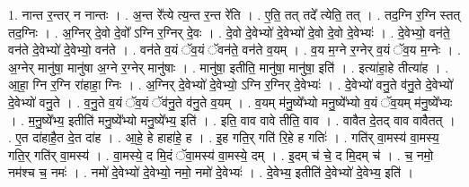 \documentclass[17pt]{extarticle}
\begin{document}
1. नान्त र॒न्तर् न नान्तः । . अ॒न्त रे᳚त्ये त्य॒न्त र॒न्त रे॑ति । . ए॒ति॒ तत् तदे᳚ त्येति॒ तत् । . तद॒ग्नि र॒ग्नि स्तत् तद॒ग्निः । . अ॒ग्निर् दे॒वो दे॒वो᳚ ऽग्नि र॒ग्निर् दे॒वः । . दे॒वो दे॒वेभ्यो॑ दे॒वेभ्यो॑ दे॒वो दे॒वो दे॒वेभ्यः॑ । . दे॒वेभ्यो॒ वन॑ते॒ वन॑ते दे॒वेभ्यो॑ दे॒वेभ्यो॒ वन॑ते । . वन॑ते व॒यं ॅव॒यं ॅवन॑ते॒ वन॑ते व॒यम् । . व॒य म॒ग्ने र॒ग्नेर् व॒यं ॅव॒य म॒ग्नेः । . अ॒ग्नेर् मानु॑षा॒ मानु॑षा अ॒ग्ने र॒ग्नेर् मानु॑षाः । . मानु॑षा॒ इतीति॒ मानु॑षा॒ मानु॑षा॒ इति॑ । . इत्या॑हा॒हे तीत्या॑ह । . आ॒हा॒ ग्नि र॒ग्नि रा॑हाहा॒ ग्निः । . अ॒ग्निर् दे॒वेभ्यो॑ दे॒वेभ्यो॒ ऽग्नि र॒ग्निर् दे॒वेभ्यः॑ । . दे॒वेभ्यो॑ वनु॒ते व॑नु॒ते दे॒वेभ्यो॑ दे॒वेभ्यो॑ वनु॒ते । . व॒नु॒ते व॒यं ॅव॒यं ॅव॑नु॒ते व॑नु॒ते व॒यम् । . व॒यम् म॑नु॒ष्ये᳚भ्यो मनु॒ष्ये᳚भ्यो व॒यं ॅव॒यम् म॑नु॒ष्ये᳚भ्यः । . म॒नु॒ष्ये᳚भ्य॒ इतीति॑ मनु॒ष्ये᳚भ्यो मनु॒ष्ये᳚भ्य॒ इति॑ । . इति॒ वाव वावे तीति॒ वाव । . वावैत दे॒तद् वाव वावैतत् । . ए॒त दा॑हाहै॒त दे॒त दा॑ह । . आ॒हे॒ हे हाहा॑हे॒ ह । . इ॒ह गति॒र् गति॑ रि॒हे ह गतिः॑ । . गति॑र् वा॒मस्य॑ वा॒मस्य॒ गति॒र् गति॑र् वा॒मस्य॑ । . वा॒मस्ये॒ द मि॒दं ॅवा॒मस्य॑ वा॒मस्ये॒ दम् । . इ॒दम् च॑ चे॒ द मि॒दम् च॑ । . च॒ नमो॒ नम॑श्च च॒ नमः॑ । . नमो॑ दे॒वेभ्यो॑ दे॒वेभ्यो॒ नमो॒ नमो॑ दे॒वेभ्यः॑ । . दे॒वेभ्य॒ इतीति॑ दे॒वेभ्यो॑ दे॒वेभ्य॒ इति॑ । \newline
\end{document}
